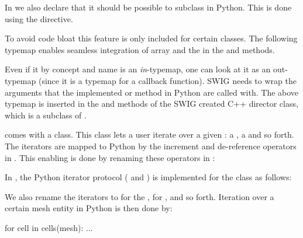 In  we also declare that it should be possible to
subclass  in Python. This is done using the
 directive.
\begin{swigcode}
\end{swigcode}
To avoid code bloat this feature is only included for certain classes.
The following typemap enables seamless integration of \numpy array and
the  in the  and  methods.
Even if it by concept and name is an \textit{in}-typemap, one can look at
it as an out-typemap (since it is a typemap for a callback function). SWIG
needs to wrap the arguments that the implemented  or 
method in Python are called with. The above typemap is inserted in the
 and  methods of the SWIG created C++ director class,
which is a subclass of .

\dolfin comes with a \-\- class. This
class lets a user iterate over a given : a ,
a  and so forth. The iterators are mapped to Python by the
increment and de-reference operators in . This
enabling is done by renaming these operators in :
\begin{swigcode}
\end{swigcode}
In , the Python iterator
protocol ( and ) is implemented for the\break
{} class as
follows:
We also rename the iterators to  for the ,  for , and so forth. Iteration over a certain mesh entity in Python is then done by:
\begin{python}
for cell in cells(mesh):
    ...
\end{python}

